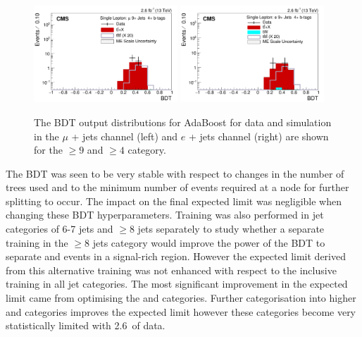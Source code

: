 \begin{figure}[ht!]
    \includegraphics[width=0.48\textwidth]{images/Run2/BDT_Mu29Aug400trees_5MinNodeSize_20nCuts_3MaxDepth_5adaboostbeta_adaBoost_alphaSTune_noMinEvents9nJets4nMtags_StackLogY.pdf}
    \includegraphics[width=0.48\textwidth]{images/Run2/BDT_El29Aug400trees_5MinNodeSize_20nCuts_3MaxDepth_5adaboostbeta_adaBoost_alphaSTune_noMinEvents9nJets4nMtags_StackLogY.pdf}    
    \caption{The BDT output distributions for AdaBoost for data and simulation in the $\mu$ + jets channel (left) and $e$ + jets channel (right) are shown for the $\geq9$ \njets and $\geq4$ \nMtags category.}
    \label{fig:BDT_Mu29Aug400trees_5MinNodeSize_20nCuts_3MaxDepth_5adaboostbeta_adaBoost_alphaSTune_noMinEvents94}
\end{figure}

The BDT was seen to be very stable with respect to changes in the number of trees used and to the minimum number of events required at a node for further splitting to occur. The impact on the final expected limit was negligible when changing these BDT hyperparameters. Training was also performed in jet categories of 6-7 jets and $\geq$8 jets separately to study whether a separate training in the $\geq8$ jets category would improve the power of the BDT to separate \ttbar and \tttt events in a signal-rich region. However the expected limit derived from this alternative training was not enhanced with respect to the inclusive training in all jet categories. The most significant improvement in the expected limit came from optimising the \njets and \nMtags categories. Further categorisation into higher \njets and \nMtags categories improves the expected limit however these categories become very statistically limited with 2.6~\fbinv of data.

